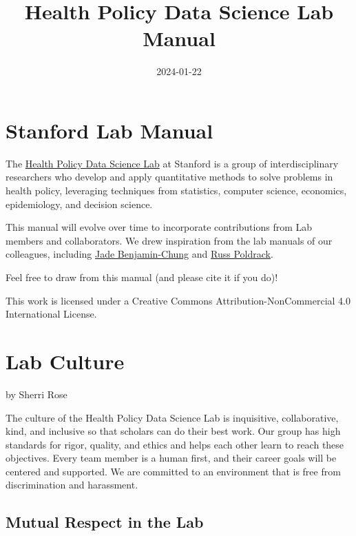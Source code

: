 \documentclass[
]{book}
\title{Health Policy Data Science Lab Manual}
\author{}
\date{\vspace{-2.5em}2024-01-22}
\begin{document}
\maketitle

{
\setcounter{tocdepth}{1}
\tableofcontents
}
\hypertarget{stanford-lab-manual}{%
\chapter{Stanford Lab Manual}\label{stanford-lab-manual}}

The \href{http://healthpolicydatascience.org/}{Health Policy Data Science Lab} at Stanford is a group of interdisciplinary researchers who develop and apply quantitative methods to solve problems in health policy, leveraging techniques from statistics, computer science, economics, epidemiology, and decision science.

This manual will evolve over time to incorporate contributions from Lab members and collaborators. We drew inspiration from the lab manuals of our colleagues, including \href{https://jadebc.github.io/lab-manual/index.html}{Jade Benjamin-Chung} and \href{https://poldracklab.org/labguide/}{Russ Poldrack}.

Feel free to draw from this manual (and please cite it if you do)!

This work is licensed under a Creative Commons Attribution-NonCommercial 4.0 International License.

\hypertarget{lab-culture}{%
\chapter{Lab Culture}\label{lab-culture}}

by Sherri Rose

The culture of the Health Policy Data Science Lab is inquisitive, collaborative, kind, and inclusive so that scholars can do their best work. Our group has high standards for rigor, quality, and ethics and helps each other learn to reach these objectives. Every team member is a human first, and their career goals will be centered and supported. We are committed to an environment that is free from discrimination and harassment.

\hypertarget{mutual-respect-in-the-lab}{%
\section{Mutual Respect in the Lab}\label{mutual-respect-in-the-lab}}
\end{document}
